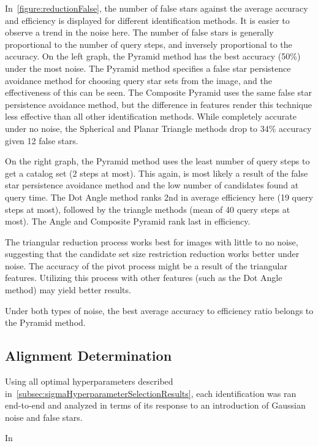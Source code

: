 In~\autoref{figure:reductionFalse}, the number of false stars against the average accuracy and efficiency is displayed
for different identification methods.
It is easier to observe a trend in the noise here.
The number of false stars is generally proportional to the number of query steps, and inversely proportional
to the accuracy.
On the left graph, the Pyramid method has the best accuracy (50\%) under the most noise.
The Pyramid method specifies a false star persistence avoidance method for choosing query star sets from the image, and
the effectiveness of this can be seen.
The Composite Pyramid uses the same false star persistence avoidance method, but the difference in features render this
technique less effective than all other identification methods.
While completely accurate under no noise, the Spherical and Planar Triangle methods drop to 34\% accuracy given
12 false stars.

On the right graph, the Pyramid method uses the least number of query steps to get a catalog set (2 steps at most).
This again, is most likely a result of the false star persistence avoidance method and the low number of candidates
found at query time.
The Dot Angle method ranks 2nd in average efficiency here (19 query steps at most), followed by the triangle methods
(mean of 40 query steps at most).
The Angle and Composite Pyramid rank last in efficiency.

The triangular reduction process works best for images with little to no noise, suggesting that the candidate set
size restriction reduction works better under noise.
The accuracy of the pivot process might be a result of the triangular features.
Utilizing this process with other features (such as the Dot Angle method) may yield better results.

Under both types of noise, the best average accuracy to efficiency ratio belongs to the Pyramid method.

\subsection{Alignment Determination}\label{subsec:alignmentDeterminationResults}
Using all optimal hyperparameters described in~\autoref{subsec:sigmaHyperparameterSelectionResults}, each identification
was ran end-to-end and analyzed in terms of its response to an introduction of Gaussian noise and false stars.

In

